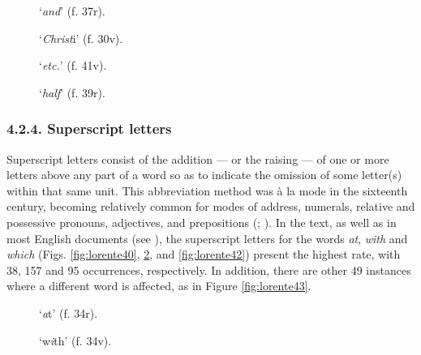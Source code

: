 \begin{paper}
\begin{figure}[H]
  \centering
  \begin{minipage}[b]{0.36\textwidth}
    \caption{`\emph{and}' (f. 37r).\\}
    \label{fig:lorente36}
  \end{minipage}
  \hfill
  \begin{minipage}[b]{0.36\textwidth}
    \caption{`\emph{Christ}i' (f. 30v).\\}
    \label{fig:lorente37}
  \end{minipage}
\hfill
  \begin{minipage}[b]{0.36\textwidth}
    \caption{`\emph{etc.}' (f. 41v).}
    \label{fig:lorente38}
  \end{minipage}
  \hfill
  \begin{minipage}[b]{0.36\textwidth}
    \caption{`\emph{half}' (f. 39r).}
    \label{fig:lorente39}
  \end{minipage}
\end{figure}

\subsubsection{4.2.4. Superscript letters}

Superscript letters consist of the addition –– or the raising –– of one
or more letters above any part of a word so as to indicate
the omission of some letter(s) within that same unit. This abbreviation
method was à la mode in the sixteenth century, becoming relatively
common for modes of address, numerals, relative and possessive pronouns,
adjectives, and prepositions (\cite[134]{tannenbaum_handwriting_1930}; \cite[24]{petti_english_1977}). In
the text, as well as in most English documents (see \cite[119]{calle-martin_corpus-based_2021}), the superscript letters for the words \emph{\th}\emph{at}, \emph{with} and
\emph{which} (Figs. \ref{fig:lorente40}, \ref{fig:lorente41}, and \ref{fig:lorente42}) present the highest rate, with 38,
157 and 95 occurrences, respectively. In addition, there are other 49
instances where a different word is affected, as in Figure \ref{fig:lorente43}.

\begin{figure}[H]
  \centering
  \begin{minipage}[b]{0.36\textwidth}
    \caption{`\th\emph{a}t' (f. 34r).}
    \label{fig:lorente40}
  \end{minipage}
  \hfill
  \begin{minipage}[b]{0.36\textwidth}
    \caption{`w\emph{i}th' (f. 34v).}
    \label{fig:lorente41}
  \end{minipage}
\end{figure}


\end{paper}
